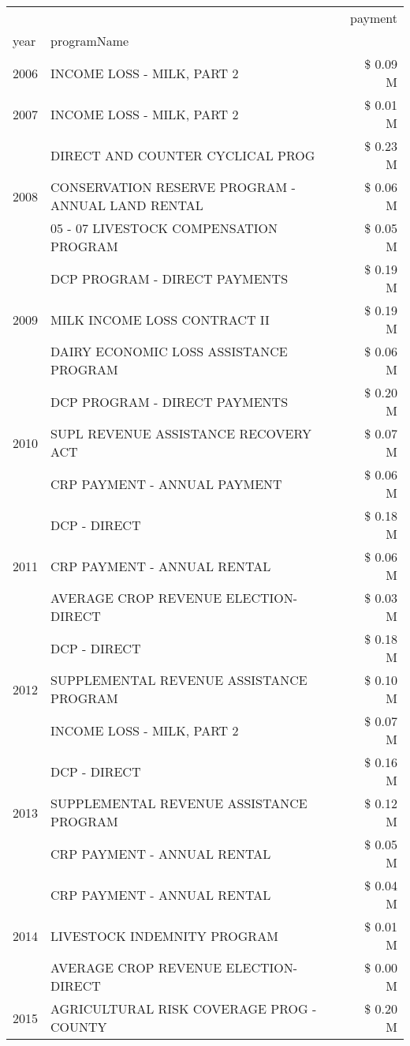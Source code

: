 \begin{tabular}{llr}
\toprule
 &  & payment \\
year & programName &  \\
\midrule
2006 & INCOME LOSS - MILK, PART 2 & \$ 0.09 M \\
\cline{1-3}
2007 & INCOME LOSS - MILK, PART 2 & \$ 0.01 M \\
\cline{1-3}
\multirow[t]{3}{*}{2008} & DIRECT AND COUNTER CYCLICAL PROG & \$ 0.23 M \\
 & CONSERVATION RESERVE PROGRAM - ANNUAL LAND RENTAL & \$ 0.06 M \\
 & 05 - 07 LIVESTOCK COMPENSATION PROGRAM & \$ 0.05 M \\
\cline{1-3}
\multirow[t]{3}{*}{2009} & DCP PROGRAM - DIRECT PAYMENTS & \$ 0.19 M \\
 & MILK INCOME LOSS CONTRACT II & \$ 0.19 M \\
 & DAIRY ECONOMIC LOSS ASSISTANCE PROGRAM & \$ 0.06 M \\
\cline{1-3}
\multirow[t]{3}{*}{2010} & DCP PROGRAM - DIRECT PAYMENTS & \$ 0.20 M \\
 & SUPL REVENUE ASSISTANCE RECOVERY ACT & \$ 0.07 M \\
 & CRP PAYMENT - ANNUAL PAYMENT & \$ 0.06 M \\
\cline{1-3}
\multirow[t]{3}{*}{2011} & DCP - DIRECT & \$ 0.18 M \\
 & CRP PAYMENT - ANNUAL RENTAL & \$ 0.06 M \\
 & AVERAGE CROP REVENUE ELECTION-DIRECT & \$ 0.03 M \\
\cline{1-3}
\multirow[t]{3}{*}{2012} & DCP - DIRECT & \$ 0.18 M \\
 & SUPPLEMENTAL REVENUE ASSISTANCE PROGRAM & \$ 0.10 M \\
 & INCOME LOSS - MILK, PART 2 & \$ 0.07 M \\
\cline{1-3}
\multirow[t]{3}{*}{2013} & DCP - DIRECT & \$ 0.16 M \\
 & SUPPLEMENTAL REVENUE ASSISTANCE PROGRAM & \$ 0.12 M \\
 & CRP PAYMENT - ANNUAL RENTAL & \$ 0.05 M \\
\cline{1-3}
\multirow[t]{3}{*}{2014} & CRP PAYMENT - ANNUAL RENTAL & \$ 0.04 M \\
 & LIVESTOCK INDEMNITY PROGRAM & \$ 0.01 M \\
 & AVERAGE CROP REVENUE ELECTION-DIRECT & \$ 0.00 M \\
\cline{1-3}
\multirow[t]{3}{*}{2015} & AGRICULTURAL RISK COVERAGE PROG - COUNTY & \$ 0.20 M \\

\end{tabular}
